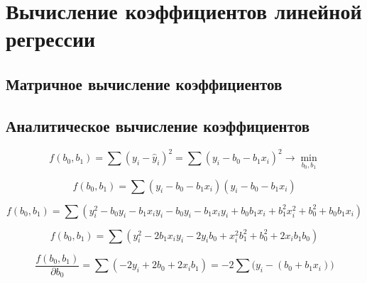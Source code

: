 \documentclass[
  letterpaper,
  DIV=11,
  numbers=noendperiod]{scrreprt}
\newcommand{\Cline}[2][red]{{\sbox\MBox{$#2$}%
  \rlap{\usebox\MBox}\color{#1}\rule[-1.2\dp\MBox]{\wd\MBox}{0.5pt}}}
\newcommand{\norm}{\mathcal{N}}
\newcommand{\def}{\overset{\text{def}}{=}}
\newcommand{\sgn}{\mathrm{sgn}}
\newcommand{\artanh}{\text{artanh}}
\newcommand{\median}{\mathrm{median}}
\newcommand{\mean}{\mathbb{M}}
\newcommand{\skew}{\mathrm{skew}}
\newcommand{\kurt}{\mathrm{kurt}}
\theoremstyle{definition}
\theoremstyle{remark}
\begin{document}
\newsavebox{\MBox}
\newcommand{\Cline}[2][red]{{\sbox\MBox{$#2$}%
  \rlap{\usebox\MBox}\color{#1}\rule[-1.2\dp\MBox]{\wd\MBox}{0.5pt}}}

\newcommand{\norm}{\mathcal{N}}

\newcommand{\def}{\overset{\text{def}}{=}}
\newcommand{\sgn}{\text{sgn}}

\usepackage{amsmath}
\DeclareMathOperator\artanh{artanh}

\newcommand{\median}{\text{median}}
\newcommand{\mean}{\mathbb{M}}
\newcommand{\skew}{\mathrm{skew}}
\newcommand{\kurt}{\mathrm{kurt}}

\section{Вычисление коэффициентов линейной
регрессии}\label{ux432ux44bux447ux438ux441ux43bux435ux43dux438ux435-ux43aux43eux44dux444ux444ux438ux446ux438ux435ux43dux442ux43eux432-ux43bux438ux43dux435ux439ux43dux43eux439-ux440ux435ux433ux440ux435ux441ux441ux438ux438}

\subsection{Матричное вычисление
коэффициентов}\label{ux43cux430ux442ux440ux438ux447ux43dux43eux435-ux432ux44bux447ux438ux441ux43bux435ux43dux438ux435-ux43aux43eux44dux444ux444ux438ux446ux438ux435ux43dux442ux43eux432}

\subsection{Аналитическое вычисление
коэффициентов}\label{ux430ux43dux430ux43bux438ux442ux438ux447ux435ux441ux43aux43eux435-ux432ux44bux447ux438ux441ux43bux435ux43dux438ux435-ux43aux43eux44dux444ux444ux438ux446ux438ux435ux43dux442ux43eux432}

\[
f(b_0, b_1) = \sum (y_i - \hat y_i)^2 = \sum (y_i - b_0 - b_1x_i)^2 \rightarrow \min_{b_0, b_1}
\]

\[
f(b_0, b_1) = \sum (y_i - b_0 - b_1x_i) (y_i - b_0 - b_1x_i)
\]

\[
f(b_0, b_1) = 
\sum (y_i^2 - b_0 y_i - b_1 x_i y_i - b_0 y_i - b_1 x_i y_i + b_0 b_1 x_i + b_1^2 x_i^2 + b_0^2 + b_0 b_1 x_i)
\]

\[
f(b_0, b_1) = 
\sum(y_i^2 - 2 b_1 x_i y_i - 2 y_i b_0 + x_i^2 b_1^2 + b_0^2 + 2 x_i b_1 b_0)
\]

\[
\frac{f(b_0, b_1)}{\partial b_0} = \sum (-2y_i + 2b_0 + 2x_ib_1) = 
-2 \sum \big( y_i - (b_0 + b_1 x_i) \big)
\]
\end{document}
